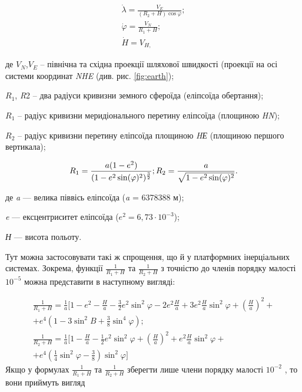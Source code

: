 \[\begin{array}{l} 
{\dot{\lambda}=\frac{V_{E}}{(R_{2} +H)\cos \varphi} ;} \\ 
{\dot{\varphi}=\frac{V_{N}}{R_{1} +H} ;} \\ 
{\dot{H}=V_{H,}} 
\end{array}\] 
\begin{ESKDexplanation}
\item де  $V_{N}$,$V_{E}$ -- північна та східна проекції шляхової швидкості 
(проекції на осі  системи координат \textit{NHE}  (див. рис. \ref{fig:earth}); 
\item $R_1$, \textit{R}2 -- два радіуси кривизни земного сфероїда (еліпсоїда обертання); 
\item $R_1$ -- радіус кривизни меридіонального перетину еліпсоїда (площиною \textit{HN}); 
\item $R_2$  -- радіус кривизни перетину еліпсоїда площиною \textit{HЕ} (площиною першого вертикала); 
\end{ESKDexplanation}
\[R_{1} =\frac{a(1-e^{2})}{(1-e^{2} \sin(\varphi)^{2})^{\frac{3}{2}}};\\
R_{2} =\frac{a}{\sqrt{1-e^{2} \sin(\varphi)^{2}}}.\] 
\begin{ESKDexplanation}
\item де\textit{ a}  --- велика піввісь  еліпсоїда (\textit{a }=  6378388 м); 
\item \textit{e} --- ексцентриситет еліпсоїда  ($e^{2} = 6,73 \cdot 10^{-3}$);  
\item \textit{Н}  --- висота польоту. 
\end{ESKDexplanation}
Тут можна застосовувати такі ж спрощення, що й у платформних інерціальних системах. 
Зокрема, функції   $\frac{1}{R_{1} +H}$ та $\frac{1}{R_{2} +H} $ 
з точністю до членів порядку малості $10^{-5}$ можна представити 
в наступному вигляді:

\[\begin{array}{l} 
{\frac{1}{R_{1} +H} =\frac{1}{a} [1-e^{2} -\frac{H}{a} 
-\frac{3}{2} e^{2} \sin ^{2} \varphi-2e^{2} \frac{H}{a} +3e^{2} \frac{H}{a} \sin 
^{2} \varphi + (\frac{H}{a} )^{2} +}\\
{+e^{4} (1-3\sin ^{2} B+\frac{3}{8}\sin ^{4} \varphi);} \\ 

{\frac{1}{R_{2} +H} =\frac{1}{a}[1-\frac{H}{a} 
-\frac{1}{2} e^{2} \sin ^{2} \varphi+(\frac{H}{a})^{2} +e^{2} \frac{H}{a} 
\sin ^{2} \varphi+} \\ 
{+e^{4}(\frac{1}{4} \sin ^{2} \varphi-\frac{3}{8})\sin ^{2} \varphi]} 
\end{array}\] 
Якщо у формулах $\frac{1}{R_{1} +H}$ та $\frac{1}{R_{2} +H}$ 
зберегти лише члени порядку малості $10^{-2}$ , то вони приймуть 
вигляд

